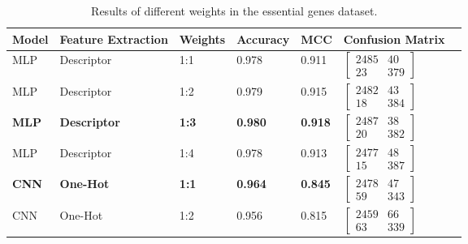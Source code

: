 \begin{table}[ht]
	\caption{Results of different weights in the essential genes dataset.}
	\label{tab:weights}
    \centering
    \begin{tabular}{lllllll}
    	\toprule
    	\textbf{Model} & \textbf{Feature Extraction} & \textbf{Weights} & \textbf{Accuracy}  & \textbf{MCC} & \textbf{Confusion Matrix}\\\midrule
    	
    	MLP & Descriptor & 1:1 & 0.978 & 0.911 & 
    	$\begin{bmatrix}
            2485 & 40\\ 
            23 & 379
        \end{bmatrix}$
        \\
        
        MLP & Descriptor & 1:2 & 0.979 & 0.915 & 
    	$\begin{bmatrix}
            2482 & 43\\ 
            18 & 384
        \end{bmatrix}$
        \\
        
        \textbf{MLP} & \textbf{Descriptor} & \textbf{1:3} & \textbf{0.980} & \textbf{0.918} & 
    	$\begin{bmatrix}
            2487 & 38\\ 
            20 & 382
        \end{bmatrix}$
        \\
        
        MLP & Descriptor & 1:4 & 0.978 & 0.913 & 
    	$\begin{bmatrix}
            2477 & 48\\ 
            15 & 387
        \end{bmatrix}$
        \\\midrule
        
        \textbf{CNN} & \textbf{One-Hot} & \textbf{1:1} & \textbf{0.964} & \textbf{0.845} & 
    	$\begin{bmatrix}
            2478 & 47\\ 
            59 & 343
        \end{bmatrix}$
        \\
        
        CNN & One-Hot & 1:2 & 0.956 & 0.815 & 
    	$\begin{bmatrix}
            2459 & 66\\ 
            63 & 339
        \end{bmatrix}$
        \\
        

\end{tabular}
\end{table}
